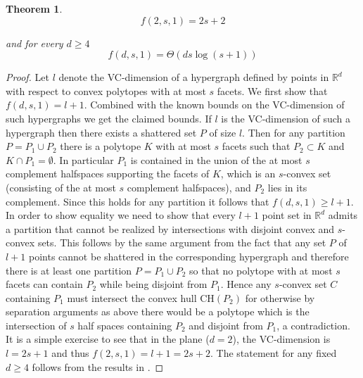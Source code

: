 \documentclass[11pt]{article}
\def\Re{\mathbb R}
\theoremstyle{plain}
\newtheorem{theorem}{Theorem}[section]
\theoremstyle{definition}
\theoremstyle{remark}
\def\marrow{{\marginpar[\hfill$\longrightarrow$]{$\longleftarrow$}}}
\def\shakhar#1{{\sc Shakhar says: }{\marrow\sf #1}}
\begin{document}
\begin{theorem}
     $$f(2,s,1)=2s+2$$ 

     \newline and for every $d \geq 4$ $$f(d,s,1)= \Theta(d s \log (s+1))$$
    
\end{theorem}
\begin{proof}
    Let $l$ denote the VC-dimension of a hypergraph defined by points in $\Re^d$ with respect to convex polytopes with at most $s$ facets. We first show that $f(d,s,1)= l+1$. Combined with the known bounds on the VC-dimension of such hypergraphs  we get the claimed bounds.
    If $l$ is the VC-dimension of such a hypergraph then there exists a shattered set $P$ of size $l$. Then for any partition $P = P_1 \cup P_2$ there is a polytope $K$ with at most $s$ facets such that $P_2 \subset K$ and $K \cap P_1 = \emptyset$. In particular $P_1$ is contained in the union of the at most $s$ complement halfspaces supporting the facets of $K$, which is an $s$-convex set (consisting of the at most $s$ complement halfspaces), and $P_2$ lies in its complement. 
    Since this holds for any partition it follows that $f(d,s,1) \geq l+1$. In order to show equality we need to show that every $l+1$ point set in $\Re^d$ admits a partition that cannot be realized by intersections with disjoint convex and $s$-convex sets. This follows by the same argument from the fact that any set $P$ of $l+1$ points cannot be shattered in the corresponding hypergraph and therefore there is at least one partition $P=P_1 \cup P_2$ so that no polytope with at most $s$ facets can contain $P_2$ while being disjoint from $P_1$. Hence any $s$-convex set $C$ containing $P_1$ must intersect the convex hull $\text{CH}(P_2)$ for otherwise by separation arguments as above there would be a polytope which is the intersection of $s$ half spaces containing $P_2$ and disjoint from $P_1$, a contradiction.
    It is a simple exercise to see that in the plane ($d=2$), the VC-dimension is $l=2s+1$ and thus $f(2,s,1)=l+1 = 2s+2$. The statement for any fixed $d \geq 4$ follows from the results in
    \cite{CMK2019}.

\end{proof}
\end{document}
